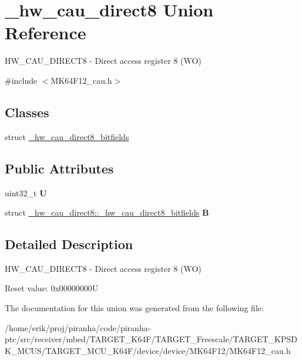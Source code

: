 \hypertarget{union__hw__cau__direct8}{}\section{\+\_\+hw\+\_\+cau\+\_\+direct8 Union Reference}
\label{union__hw__cau__direct8}


H\+W\+\_\+\+C\+A\+U\+\_\+\+D\+I\+R\+E\+C\+T8 -\/ Direct access register 8 (WO)  




{\ttfamily \#include $<$M\+K64\+F12\+\_\+cau.\+h$>$}

\subsection*{Classes}
\begin{DoxyCompactItemize}
\item 
struct \hyperlink{struct__hw__cau__direct8_1_1__hw__cau__direct8__bitfields}{\+\_\+hw\+\_\+cau\+\_\+direct8\+\_\+bitfields}
\end{DoxyCompactItemize}
\subsection*{Public Attributes}
\begin{DoxyCompactItemize}
\item 
uint32\+\_\+t {\bfseries U}\hypertarget{union__hw__cau__direct8_abb16e04c55870c2fc1cb7fa0d13e89a2}{}\label{union__hw__cau__direct8_abb16e04c55870c2fc1cb7fa0d13e89a2}

\item 
struct \hyperlink{struct__hw__cau__direct8_1_1__hw__cau__direct8__bitfields}{\+\_\+hw\+\_\+cau\+\_\+direct8\+::\+\_\+hw\+\_\+cau\+\_\+direct8\+\_\+bitfields} {\bfseries B}\hypertarget{union__hw__cau__direct8_ab5edb040106a227324357396a97cc612}{}\label{union__hw__cau__direct8_ab5edb040106a227324357396a97cc612}

\end{DoxyCompactItemize}


\subsection{Detailed Description}
H\+W\+\_\+\+C\+A\+U\+\_\+\+D\+I\+R\+E\+C\+T8 -\/ Direct access register 8 (WO) 

Reset value\+: 0x00000000U 

The documentation for this union was generated from the following file\+:\begin{DoxyCompactItemize}
\item 
/home/erik/proj/piranha/code/piranha-\/ptc/src/receiver/mbed/\+T\+A\+R\+G\+E\+T\+\_\+\+K64\+F/\+T\+A\+R\+G\+E\+T\+\_\+\+Freescale/\+T\+A\+R\+G\+E\+T\+\_\+\+K\+P\+S\+D\+K\+\_\+\+M\+C\+U\+S/\+T\+A\+R\+G\+E\+T\+\_\+\+M\+C\+U\+\_\+\+K64\+F/device/device/\+M\+K64\+F12/M\+K64\+F12\+\_\+cau.\+h\end{DoxyCompactItemize}
